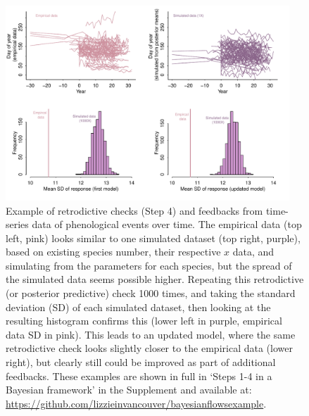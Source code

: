\documentclass[11pt]{article}
\begin{document}
\begin{figure}[ht]
\centering
\noindent \includegraphics[width=0.95\textwidth]{examples/synchrony/graphs/fourpanelforpaper.pdf} %
\caption{Example of retrodictive checks (Step 4) and feedbacks from time-series data of phenological events over time. The empirical data (top left, pink) looks similar to one simulated dataset (top right, purple), based on existing species number, their respective $x$ data, and simulating from the parameters for each species, but the spread of the simulated data seems possible higher. Repeating this retrodictive (or posterior predictive) check 1000 times, and taking the standard deviation (SD) of each simulated dataset, then looking at the resulting histogram confirms this (lower left in purple, empirical data SD in pink). This leads to an updated model, where the same retrodictive check looks slightly closer to the empirical data (lower right), but clearly still could be improved as part of additional feedbacks. These examples are shown in full in `Steps 1-4 in a Bayesian framework' in the Supplement and available at: \url{https://github.com/lizzieinvancouver/bayesianflowsexample}.}
\label{fig:retrodictivecheck}
\end{figure}
\end{document}
